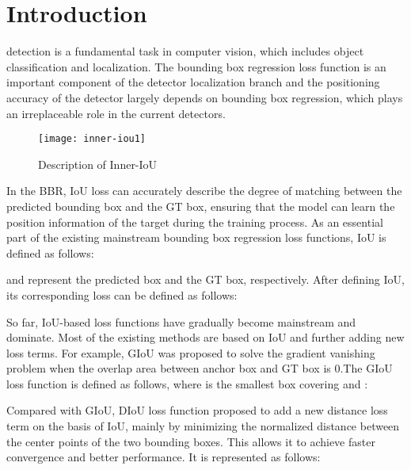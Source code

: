 \documentclass[lettersize,journal]{IEEEtran}
\begin{document}
	\section{Introduction}
	 detection is a fundamental task in computer vision, which includes object classification and localization. The bounding box regression loss function is an important component of the detector localization branch and the positioning accuracy of the detector largely depends on bounding box regression, which plays an irreplaceable role in  the current detectors. 
	\begin{figure}[!t]
		\centering
		\texttt{[image: inner-iou1]}
		\caption{Description of Inner-IoU }
		\label{fig_1} \end{figure}
	In the BBR, IoU loss\cite{ref1} can accurately describe the degree of matching between the predicted bounding box and the GT box, ensuring that the model can learn the position information of the target during the training process.
	As an essential part  of the existing mainstream bounding box regression loss functions, IoU is defined as follows:
	
	\par  and   represent the predicted box and the GT box, respectively. After defining IoU, its corresponding loss can be defined as follows:
	
	\par So far, IoU-based loss functions have gradually become mainstream and dominate. Most of the existing methods are based on IoU and further adding new loss terms. For example, GIoU\cite{ref2} was proposed to solve the gradient vanishing problem when the overlap area between anchor box and GT box is 0.The GIoU loss function\cite{ref2} is defined as follows, where  is the smallest box covering  and :  	
	 
	Compared with GIoU, DIoU loss\cite{ref3} function proposed to add a new distance loss term on the basis of IoU, mainly by minimizing the normalized distance between the center points of the two bounding boxes. This allows it to achieve faster convergence and better performance. It is represented as follows:
	
\end{document}
